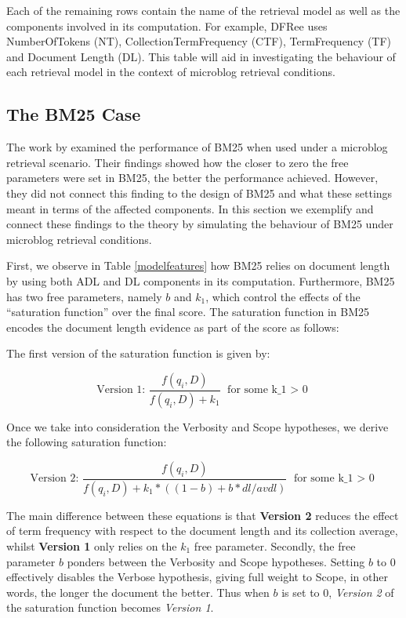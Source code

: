 Each of the remaining rows contain the name of the retrieval model as well as the components involved in its computation. For example, DFRee uses NumberOfTokens (NT), CollectionTermFrequency (CTF), TermFrequency (TF) and Document Length (DL).
This table will aid in investigating the behaviour of each retrieval model in the context of microblog retrieval conditions.


\subsection{The BM25 Case}
\label{bm25case}
The work by \cite{ferguson2012investigation} examined the performance of BM25 when used under a microblog retrieval scenario. Their findings showed how the closer to zero the free parameters were set in BM25, the better the performance achieved. However, they did not connect this finding to the design of BM25 and what these settings meant in terms of the affected components. In this section we exemplify and connect these findings to the theory by simulating the behaviour of BM25 under microblog retrieval conditions.

First, we observe in Table \ref{modelfeatures} how BM25 relies on document length by using both ADL and DL components in its computation. Furthermore, BM25 has two free parameters, namely \(b\) and \(k_1\), which control the effects of the ``saturation function'' over the final score. The saturation function in BM25 encodes the document length evidence as part of the score as follows: 

The first version of the saturation function is given by:

\begin{equation}
 \text{Version 1: }\frac{f(q_i, D)}{f(q_i, D) + k_1} \text{   for some k_1 $>$ 0}
\end{equation}

Once we take into consideration the Verbosity and Scope hypotheses, we derive the following saturation function:

\begin{equation}
 \text{Version 2: }\frac{f(q_i, D)}{f(q_i, D) + k_1*((1-b)+b*dl/avdl)} \text{   for some k_1 $>$ 0}
\end{equation}

The main difference between these equations is that \textbf{Version 2} reduces the effect of term frequency with respect to the document length and its collection average, whilst \textbf{Version 1} only relies on the \(k_1\) free parameter. Secondly, the free parameter \(b\) ponders between the Verbosity and Scope hypotheses. Setting \(b\) to 0 effectively disables the Verbose hypothesis, giving full weight to Scope, in other words, the longer the document the better. Thus when \(b\) is set to 0, \textit{Version 2} of the saturation function becomes \textit{Version 1}.

